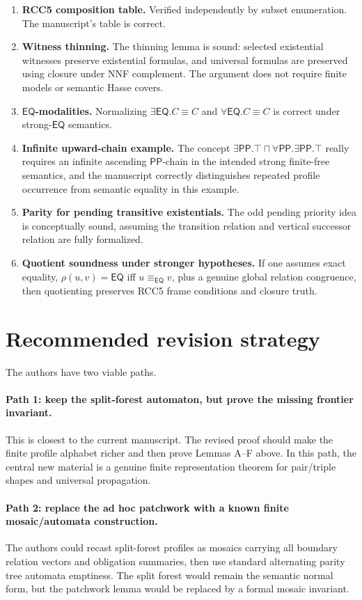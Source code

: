 \documentclass[11pt]{article}
\newcommand{\EQ}{\mathsf{EQ}}
\newcommand{\PP}{\mathsf{PP}}
\begin{document}
\begin{enumerate}[label=(S\arabic*)]
\item \textbf{RCC5 composition table.}  Verified independently by subset enumeration.  The manuscript's table is correct.
\item \textbf{Witness thinning.}  The thinning lemma is sound: selected existential witnesses preserve existential formulas, and universal formulas are preserved using closure under NNF complement.  The argument does not require finite models or semantic Hasse covers.
\item \textbf{$\EQ$-modalities.}  Normalizing $\exists\EQ.C\equiv C$ and $\forall\EQ.C\equiv C$ is correct under strong-$\EQ$ semantics.
\item \textbf{Infinite upward-chain example.}  The concept $\exists\PP.\top\sqcap\forall\PP.\exists\PP.\top$ really requires an infinite ascending $\PP$-chain in the intended strong finite-free semantics, and the manuscript correctly distinguishes repeated profile occurrence from semantic equality in this example.
\item \textbf{Parity for pending transitive existentials.}  The odd pending priority idea is conceptually sound, assuming the transition relation and vertical successor relation are fully formalized.
\item \textbf{Quotient soundness under stronger hypotheses.}  If one assumes exact equality, $\rho(u,v)=\EQ$ iff $u\equiv_{\EQ}v$, plus a genuine global relation congruence, then quotienting preserves RCC5 frame conditions and closure truth.
\end{enumerate}

\section{Recommended revision strategy}

The authors have two viable paths.

\paragraph{Path 1: keep the split-forest automaton, but prove the missing frontier invariant.}
This is closest to the current manuscript.  The revised proof should make the finite profile alphabet richer and then prove Lemmas A--F above.  In this path, the central new material is a genuine finite representation theorem for pair/triple shapes and universal propagation.

\paragraph{Path 2: replace the ad hoc patchwork with a known finite mosaic/automata construction.}
The authors could recast split-forest profiles as mosaics carrying all boundary relation vectors and obligation summaries, then use standard alternating parity tree automata emptiness.  The split forest would remain the semantic normal form, but the patchwork lemma would be replaced by a formal mosaic invariant.
\end{document}
